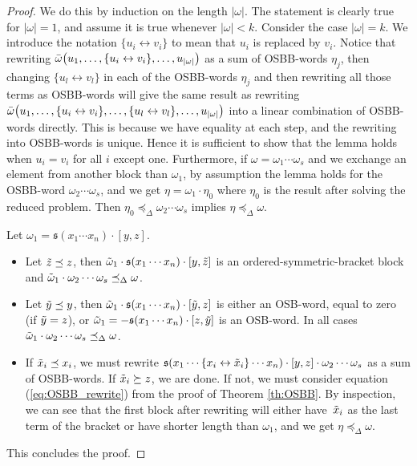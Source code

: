 \documentclass[10pt,a4paper]{amsart}
\numberwithin{equation}{section}
\begin{document}
\begin{proof}
 We do this by induction on the length $|\omega|$. The statement is clearly true for $|\omega|=1$, and assume it is true whenever $|\omega|<k$. Consider the case $|\omega|=k$. We introduce the notation $\{u_i \leftrightarrow v_i \}$ to mean that $u_i$ is replaced by $v_i$. Notice that rewriting $\Bar{\omega}\bigl(u_1, \dots , \{ u_i \leftrightarrow v_i \} , \dots ,u_{|\omega|}\bigr)$ as a sum of OSBB-words $\eta_j$, then changing $\{u_l \leftrightarrow v_l \}$ in each of the OSBB-words $\eta_j$ and then rewriting all those terms as OSBB-words will give the same result as rewriting $\Bar{\omega}\bigl(u_1, \dots , \{ u_i \leftrightarrow v_i \} , \dots , \{ u_l \leftrightarrow v_l \} , \dots ,u_{|\omega|}\bigr)$ into a linear combination of OSBB-words directly. This is because we have equality at each step, and the rewriting into OSBB-words is unique. Hence it is sufficient to show that the lemma holds when $u_i = v_i$ for all $i$ except one. Furthermore, if $\omega = \omega_1 \cdots \omega_s$ and we exchange an element from another block than $\omega_1$, by assumption the lemma holds for the OSBB-word $\omega_2 \cdots \omega_s$, and we get $\eta = \omega_1 \cdot \eta_0$ where $\eta_0$ is the result after solving the reduced problem. Then $\eta_0 \preceq_{\Delta} \omega_2 \cdots \omega_s$ implies $\eta \preceq_{\Delta} \omega$.

 Let $\omega_1 = \mathfrak{s}(x_1 \cdots x_n)\cdot[y,z]$.
 \begin{itemize}\itemsep=0pt
 \item Let $\Tilde{z}\preceq z$, then $\Tilde{\omega}_1 \cdot \mathfrak{s}(x_1 \cdots x_n)\cdot[y,\Tilde{z}]$ is an ordered-symmetric-bracket block and $\Tilde{\omega}_1 \cdot \omega_2 \cdots \omega_s \preceq_{\Delta} \omega$.
 \item Let $\Tilde{y} \preceq y$, then $\Tilde{\omega}_1 \cdot \mathfrak{s}(x_1 \cdots x_n)\cdot[\Tilde{y},z]$ is either an OSB-word, equal to zero (if $\Tilde{y}=z$), or $\Tilde{\omega}_1 = - \mathfrak{s}(x_1 \cdots x_n)\cdot[z,\Tilde{y}]$ is an OSB-word. In all cases $\Tilde{\omega}_1 \cdot \omega_2 \cdots \omega_s \preceq_{\Delta} \omega$.
 \item If $\Tilde{x}_i \preceq x_i$, we must rewrite $\mathfrak{s}(x_1 \cdots \{ x_i \leftrightarrow \Tilde{x}_i\} \cdots x_n)\cdot[y,z]\cdot \omega_2 \cdots \omega_s$ as a sum of OSBB-words. If $\Tilde{x}_i \succeq z$, we are done. If not, we must consider equation (\ref{eq:OSBB_rewrite}) from the proof of Theorem \ref{th:OSBB}. By inspection, we can see that the first block after rewriting will either have~$\Tilde{x}_i$ as the last term of the bracket or have shorter length than $\omega_1$, and we get $\eta \preceq_{\Delta} \omega$.
 \end{itemize}
 This concludes the proof.
\end{proof}
\end{document}
